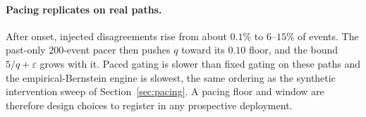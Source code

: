 \paragraph{Pacing replicates on real paths.}
After onset, injected disagreements rise from about $0.1\%$ to $6$--$15\%$ of events. The past-only $200$-event pacer then pushes $q$ toward its $0.10$ floor, and the bound $5/q+\varepsilon$ grows with it.
Paced gating is slower than fixed gating on these paths and the empirical-Bernstein engine is slowest, the same ordering as the synthetic intervention sweep of Section~\ref{sec:pacing}.
A pacing floor and window are therefore design choices to register in any prospective deployment.
